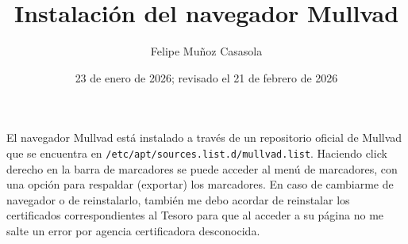 \documentclass{article}
\title{Instalación del navegador Mullvad}
\author{Felipe Muñoz Casasola}
\date{23 de enero de 2026; revisado el 21 de febrero de 2026}
\begin{document}
    \maketitle
    \clearpage
    El navegador Mullvad está instalado a través de un repositorio oficial de
    Mullvad que se encuentra en \texttt{/etc/apt/sources.list.d/mullvad.list}.
    Haciendo click derecho en la barra de marcadores se puede acceder al menú de
    marcadores, con una opción para respaldar (exportar) los marcadores. En caso
    de cambiarme de navegador o de reinstalarlo, también me debo acordar de
    reinstalar los certificados correspondientes al Tesoro para que al acceder a
    su página no me salte un error por agencia certificadora desconocida.
\end{document}
